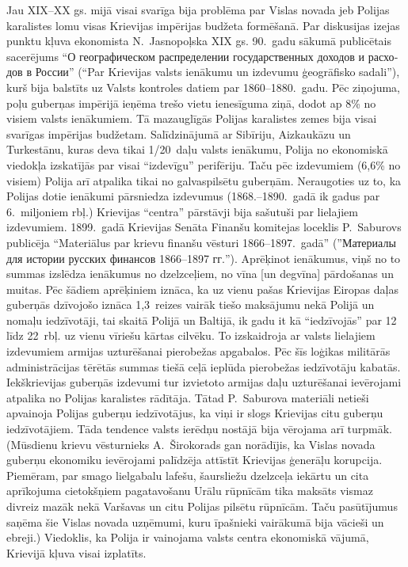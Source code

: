 \documentclass[twoside,a5paper,12pt,fleqn,openany]{extbook}
\newcommand{\rutxti}[1]{\textrussian{#1}}
\begin{document}
Jau XIX--XX gs. mijā visai svarīga bija problēma par Vislas novada jeb Polijas karalistes lomu visas Krievijas impērijas budžeta formēšanā. Par diskusijas izejas punktu kļuva ekonomista N.~Jasnopoļska XIX gs. 90.~gadu sākumā publicētais sacerējums ``\rutxti{О географическом распределении государственных доходов и расходов в России}'' (``Par Krievijas valsts ienākumu un izdevumu ģeogrāfisko sadali''), kurš bija balstīts uz Valsts kontroles datiem par 1860--1880.~gadu. Pēc ziņojuma, poļu guberņas impērijā ieņēma trešo vietu ienesīguma ziņā, dodot ap 8\% no visiem valsts ienākumiem. Tā mazauglīgās Polijas karalistes zemes bija visai svarīgas impērijas budžetam. Salīdzinājumā ar Sibīriju, Aizkaukāzu un Turkestānu, kuras deva tikai 1/20~daļu valsts ienākumu, Polija no ekonomiskā viedokļa izskatījās par visai ``izdevīgu'' perifēriju. Taču pēc izdevumiem (6,6\% no visiem) Polija arī atpalika tikai no galvaspilsētu guberņām. Neraugoties uz to, ka Polijas dotie ienākumi pārsniedza izdevumus (1868.--1890.~gadā ik gadus par 6.~miljoniem rbļ.) Krievijas ``centra'' pārstāvji bija sašutuši par lielajiem izdevumiem. 1899.~gadā Krievijas Senāta Finanšu komitejas loceklis P.~Saburovs publicēja ``Materiālus par krievu finanšu vēsturi 1866--1897.~gadā'' (''\rutxti{Материалы для истории русских финансов 1866--1897 гг.}''). Aprēķinot ienākumus, viņš no to summas izslēdza ienākumus no dzelzceļiem, no vīna [un degvīna] pārdošanas un muitas. Pēc šādiem aprēķiniem iznāca, ka uz vienu pašas Krievijas Eiropas daļas guberņās dzīvojošo iznāca 1,3~reizes vairāk tiešo maksājumu nekā Polijā un nomaļu iedzīvotāji, tai skaitā Polijā un Baltijā, ik gadu it kā ``iedzīvojās'' par 12 līdz 22~rbļ. uz vienu vīriešu kārtas cilvēku. To izskaidroja ar valsts lielajiem izdevumiem armijas uzturēšanai pierobežas apgabalos. Pēc šīs loģikas militārās administrācijas tērētās summas tiešā ceļā ieplūda pierobežas iedzīvotāju kabatās. Iekškrievijas guberņās izdevumi tur izvietoto armijas daļu uzturēšanai ievērojami atpalika no Polijas karalistes rādītāja. Tātad P.~Saburova materiāli netieši apvainoja Polijas guberņu iedzīvotājus, ka viņi ir slogs Krievijas citu guberņu iedzīvotājiem. Tāda tendence valsts ierēdņu nostājā bija vērojama arī turpmāk. (Mūsdienu krievu vēsturnieks A.~Širokorads gan norādījis, ka Vislas novada guberņu ekonomiku ievērojami palīdzēja attīstīt Krievijas ģenerāļu korupcija. Piemēram, par smago lielgabalu lafešu, šaursliežu dzelzceļa iekārtu un cita aprīkojuma cietokšņiem pagatavošanu Urālu rūpnīcām tika maksāts vismaz divreiz mazāk nekā Varšavas un citu Polijas pilsētu rūpnīcām. Taču pasūtījumus saņēma šie Vislas novada uzņēmumi, kuru īpašnieki vairākumā bija vācieši un ebreji.) Viedoklis, ka Polija ir vainojama valsts centra ekonomiskā vājumā, Krievijā kļuva visai izplatīts.
\end{document}
